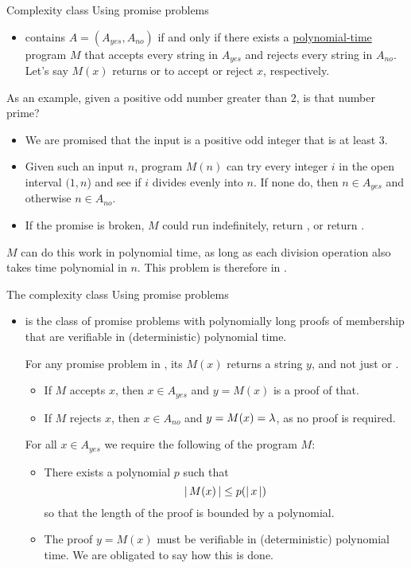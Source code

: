\begin{frame}{Complexity class }{Using promise problems}

\begin{itemize}
    \item[\CompClass{P}] contains $A=(A_{yes},A_{no})$ if and only if there exists a \href{https://en.wikipedia.org/wiki/Time_complexity\#Polynomial_time}{polynomial-time} program $M$ that accepts every string in $A_{yes}$ and rejects every string in $A_{no}$.  Let's say $M(x)$ returns \True{} or \False{} to accept or reject $x$, respectively.
\end{itemize}
As an example, given a positive odd number greater than $2$, is that number prime?
\begin{itemize}
    \item We are promised that the input is a positive odd integer that is at least $3$.
    \item Given such an input $n$,\textbf{} program $M(n)$ can try every integer $i$ in the open interval $(1,n$) and see if $i$ divides evenly into $n$.  If none do, then
    $n\in A_{yes}$ and otherwise $n\in A_{no}$.
    \item If the promise is broken, $M$ could run indefinitely, return \True{}, or return \False{}.
\end{itemize}
$M$ can do this work in polynomial time, as long as each division operation also takes time polynomial in $n$.
This problem is therefore in .
\end{frame}
\begin{frame}{The complexity class }{Using promise problems}

\begin{itemize}
    \item[\CompClass{NP}] is the class of promise problems with polynomially long proofs of membership that are verifiable in (deterministic) polynomial time.   
    
    For any promise problem in , its $M(x)$ returns a string $y$, and not just \True{} or \False{}.
    \begin{itemize}
        \item If $M$ accepts $x$, then $x\in A_{yes}$ and $y=M(x)$ is a proof of that.  
        \item If $M$ rejects $x$, then $x\in A_{no}$ and $y=M(x)=\lambda$, as no proof is required.
    \end{itemize}
    \MedSkip{}
    For all $x \in A_{yes}$ we require the following of the program $M$:
    \begin{itemize}
        \item There exists a polynomial $p$ such that \[|\,M(x)\,| \leq p(|\,x\,|)\]
        so that the length of the proof is bounded by a polynomial.
        \item  The proof $y=M(x)$ must be verifiable in (deterministic) polynomial time.  We are obligated to say how this is done.
    \end{itemize}
    
\end{itemize}
\end{frame}
